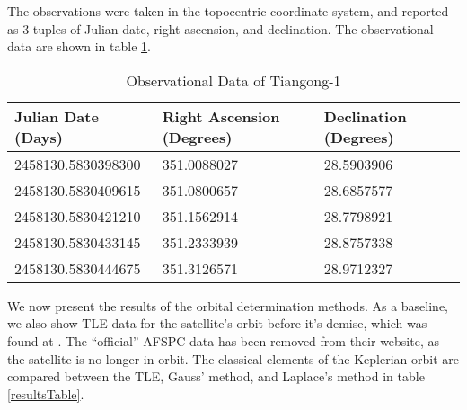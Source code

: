 \documentclass[11pt,twoside,letterpaper]{article}
\begin{document}
  The observations were taken in the topocentric coordinate system,
  and reported as 3-tuples of Julian date, right ascension, and
  declination. The observational data are shown in table
  \ref{observations}.

  \begin{table}[]
    \centering
    \begin{tabular}{|l|l|l|}
      \hline
      Julian Date (Days)& Right Ascension (Degrees)& Declination (Degrees)\\ \hline
      2458130.5830398300 & 351.0088027 & 28.5903906 \\ \hline
      2458130.5830409615 & 351.0800657 & 28.6857577 \\ \hline
      2458130.5830421210 & 351.1562914 & 28.7798921 \\ \hline
      2458130.5830433145 & 351.2333939 & 28.8757338 \\ \hline
      2458130.5830444675 & 351.3126571 & 28.9712327 \\ \hline
    \end{tabular}
    \caption{Observational Data of Tiangong-1}
    \label{observations}
  \end{table}

  We now present the results of the orbital determination methods. As
  a baseline, we also show TLE data for the satellite's orbit before
  it's demise, which was found at \cite{tiangong1-orbit}. The
  ``official'' AFSPC data has been removed from their website, as the
  satellite is no longer in orbit. The classical elements of the
  Keplerian orbit are compared between the TLE, Gauss' method, and
  Laplace's method in table \ref{resultsTable}.
\end{document}
